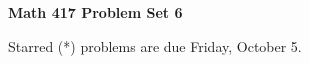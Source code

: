 \documentclass[12pt]{article}
\begin{document}
\def\ctln{\centerline}
\def\msk{\medskip}
\def\bsk{\bigskip}
\def\ssk{\smallskip}
\def\hsk{\hskip.3in}
\def\ra{\rightarrow}
\def\ubr{\underbar}

\def\mt{{\mathcal T}}
\def\mb{{\mathcal B}}
\def\ms{{\mathcal S}}
\def\mu{{\mathcal U}}
\def\mv{{\mathcal V}}

\def\bbr{{\mathbb R}}
\def\bbz{{\mathbb Z}}
\def\spc{$~$\hskip.15in$~$}

\def\sset{\subseteq}
\def\del{\partial}
\def\lra{$\Leftrightarrow$}
\def\bra{$\Rightarrow$}




\ctln{\bf Math 417 Problem Set 6}

\msk

Starred (*) problems are due Friday, October 5.
\end{document}

